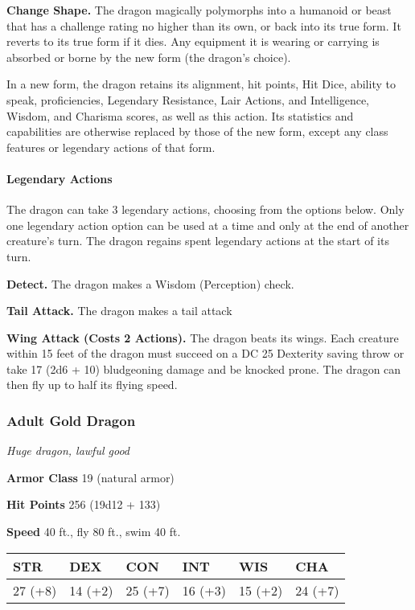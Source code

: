 \documentclass[
]{article}
\begin{document}
\textbf{Change Shape.} The dragon magically polymorphs into a humanoid
or beast that has a challenge rating no higher than its own, or back
into its true form. It reverts to its true form if it dies. Any
equipment it is wearing or carrying is absorbed or borne by the new form
(the dragon's choice).

In a new form, the dragon retains its alignment, hit points, Hit Dice,
ability to speak, proficiencies, Legendary Resistance, Lair Actions, and
Intelligence, Wisdom, and Charisma scores, as well as this action. Its
statistics and capabilities are otherwise replaced by those of the new
form, except any class features or legendary actions of that form.

\hypertarget{legendary-actions-16}{%
\paragraph{Legendary Actions}\label{legendary-actions-16}}

The dragon can take 3 legendary actions, choosing from the options
below. Only one legendary action option can be used at a time and only
at the end of another creature's turn. The dragon regains spent
legendary actions at the start of its turn.

\textbf{Detect.} The dragon makes a Wisdom (Perception) check.

\textbf{Tail Attack.} The dragon makes a tail attack

\textbf{Wing Attack (Costs 2 Actions).} The dragon beats its wings. Each
creature within 15 feet of the dragon must succeed on a DC 25 Dexterity
saving throw or take 17 (2d6 + 10) bludgeoning damage and be knocked
prone. The dragon can then fly up to half its flying speed.

\hypertarget{adult-gold-dragon}{%
\subsubsection{Adult Gold Dragon}\label{adult-gold-dragon}}

\emph{Huge dragon, lawful good}

\textbf{Armor Class} 19 (natural armor)

\textbf{Hit Points} 256 (19d12 + 133)

\textbf{Speed} 40 ft., fly 80 ft., swim 40 ft.

\begin{longtable}[]{@{}llllll@{}}
\toprule
STR & DEX & CON & INT & WIS & CHA\tabularnewline
\midrule
\endhead
27 (+8) & 14 (+2) & 25 (+7) & 16 (+3) & 15 (+2) & 24 (+7)\tabularnewline
\bottomrule
\end{longtable}
\end{document}
